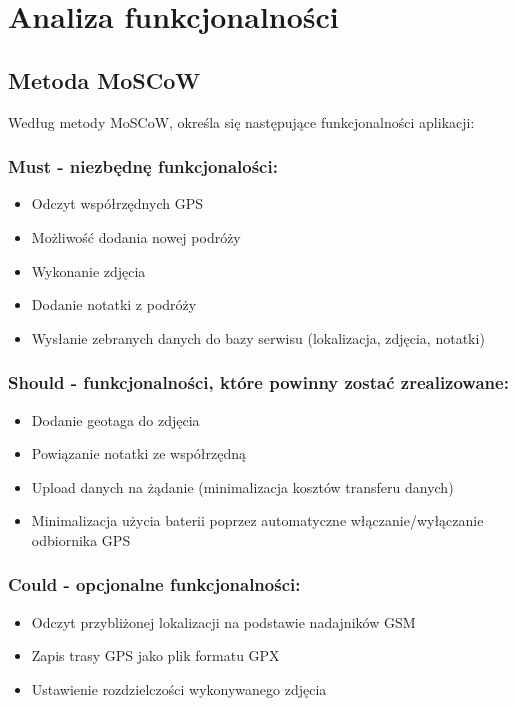 \documentclass[11pt,a4paper]{article}
\begin{document}
\section {Analiza funkcjonalności }

\subsection{Metoda MoSCoW}

Według metody MoSCoW, określa się następujące funkcjonalności aplikacji:

\subsubsection{Must - niezbędnę funkcjonalości:}
\begin{itemize}
\item Odczyt współrzędnych GPS
\item Możliwość dodania nowej podróży
\item Wykonanie zdjęcia
\item Dodanie notatki z podróży
\item Wysłanie zebranych danych do bazy serwisu (lokalizacja, zdjęcia, notatki)
\end{itemize}

\subsubsection{Should - funkcjonalności, które powinny zostać zrealizowane:}
\begin{itemize}
\item Dodanie geotaga do zdjęcia
\item Powiązanie notatki ze współrzędną
\item Upload danych na żądanie (minimalizacja kosztów transferu danych)
\item Minimalizacja użycia baterii poprzez automatyczne włączanie/wyłączanie odbiornika GPS
\end{itemize}

\subsubsection{Could - opcjonalne funkcjonalności:}
\begin{itemize}
\item Odczyt przybliżonej lokalizacji na podstawie nadajników GSM
\item Zapis trasy GPS jako plik formatu GPX
\item Ustawienie rozdzielczości wykonywanego zdjęcia
\end{itemize}
\end{document}
